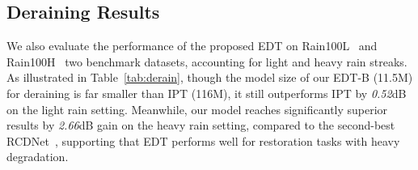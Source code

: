 \documentclass[runningheads]{llncs}
\begin{document}
	
	\subsection{Deraining Results}
	
	We also evaluate the performance of the proposed EDT on Rain100L~\cite{yang2019joint} and Rain100H~\cite{yang2019joint} two benchmark datasets, accounting for light and heavy rain streaks. As illustrated in Table~\ref{tab:derain}, though the model size of our EDT-B (11.5M) for deraining is far smaller than IPT (116M), it still outperforms IPT by \textit{0.52}dB on the light rain setting. Meanwhile, our model reaches significantly superior results by \textit{2.66}dB gain on the heavy rain setting, compared to the second-best RCDNet~\cite{wang2020model}, supporting that EDT performs well for restoration tasks with heavy degradation.
	
	
	\begin{table}[t]
\caption{Quantitative comparison for image deraining on PSNR(dB)/SSIM on the Y channel. ``'' indicates methods with a pre-training.}
		\vspace{-0.1in}
		\renewcommand\arraystretch{1.25}
		\begin{center}
		\end{center}
		\vspace{-0.15in}
\label{tab:derain}
		
	\end{table}
	
\end{document}
